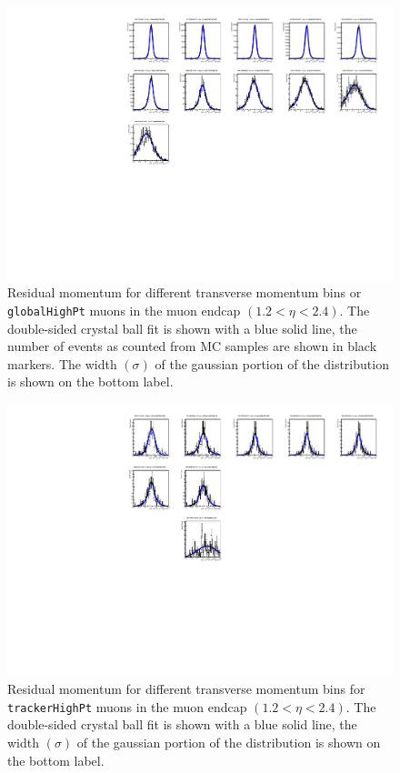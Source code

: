 \begin{figure}[tph]
  \centering
  \includegraphics[width=.9\textwidth]{fig/MomentumResolution/2016_HPResE_G_.pdf}
  \caption{Residual momentum for different transverse momentum bins
    or \texttt{globalHighPt} muons in the muon endcap $(1.2<\eta<2.4)$.
    The double-sided crystal ball fit is shown with a blue solid line,
    the number of events as counted from MC samples are shown in black markers.
    The width $(\sigma)$ of the gaussian portion of the distribution is
    shown on the bottom label.}
  \label{fig:MomentumResolutionBins_Endcap_Global}
\end{figure}

\begin{figure}[tph]
  \centering
  \includegraphics[width=.9\textwidth]{fig/MomentumResolution/2016_HPResE_T_.pdf}
  \caption{Residual momentum for different transverse momentum bins
    for \texttt{trackerHighPt} muons in the muon endcap $(1.2<\eta<2.4)$.
    The double-sided crystal ball fit is shown with a blue solid line,
    the width $(\sigma)$ of the gaussian portion of the distribution is
    shown on the bottom label.}
  \label{fig:MomentumResolutionBins_Endcap_Tracker}
\end{figure}


